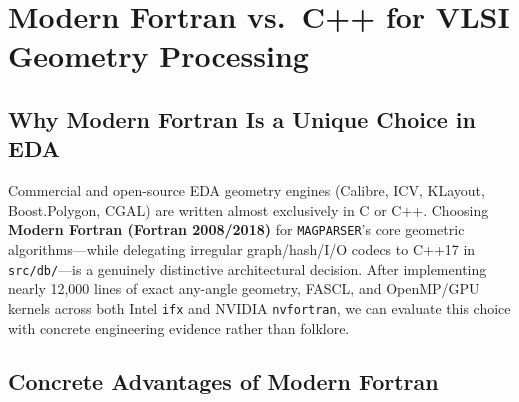 \chapter{Modern Fortran vs.\ C++ for VLSI Geometry Processing}
\label{ch:fortran_vs_cpp}

\section{Why Modern Fortran Is a Unique Choice in EDA}

Commercial and open-source EDA geometry engines (Calibre, ICV, KLayout, Boost.Polygon, CGAL) are written almost exclusively in C or C++. Choosing \textbf{Modern Fortran (Fortran 2008/2018)} for \texttt{MAGPARSER}'s core geometric algorithms---while delegating irregular graph/hash/I/O codecs to C++17 in \texttt{src/db/}---is a genuinely distinctive architectural decision. After implementing nearly 12,000 lines of exact any-angle geometry, FASCL, and OpenMP/GPU kernels across both Intel \texttt{ifx} and NVIDIA \texttt{nvfortran}, we can evaluate this choice with concrete engineering evidence rather than folklore.

\section{Concrete Advantages of Modern Fortran}

